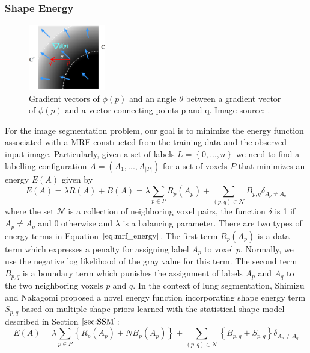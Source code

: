 \documentclass{SMBV12}
\begin{document}
\subsubsection{Shape Energy}
\begin{figure}
	\centering
    \includegraphics[width=0.3\textwidth]{images/shape_energy.png}
    \caption{Gradient vectors of $\phi(p)$ and an angle $\theta$ between a gradient vector of $\phi(p)$ and a vector connecting points p and q. Image source: \cite{shimizu2011automated}.}
    \label{fig:shape_energy}
\end{figure}
For the image segmentation problem, our goal is to minimize the energy function associated with a MRF constructed from the training data and the observed input image. Particularly, given a set of labels $L = \left\lbrace 0, ..., n \right\rbrace $ we need to find a labelling configuration $A = (A_1, ..., A_{\lvert P \rvert})$ for a set of voxels $P$ that minimizes an energy $E(A)$ given by
\begin{equation}
E(A) = \lambda R(A) + B(A) = \lambda \sum_{p \in P} R_p(A_p) + \sum_{(p, q) \in \mathcal{N}} B_{p, q} \delta_{A_p \neq A_q}
\label{eq:mrf_energy}
\end{equation}
where the set $\mathcal{N}$ is a collection of neighboring voxel pairs, the function $\delta$ is 1 if $A_p \neq A_q$ and 0 otherwise and $\lambda$ is a balancing parameter. There are two types of energy terms in Equation $\ref{eq:mrf_energy}$. The first term $R_p(A_p)$ is a data term which expresses a penalty for assigning label $A_p$ to voxel $p$. Normally, we use the negative log likelihood of the gray value for this term. The second term $B_{p, q}$ is a boundary term which punishes the assignment of labels $A_p$ and $A_q$ to the two neighboring voxels $p$ and $q$. In the context of lung segmentation, Shimizu and Nakagomi \cite{shimizu2011automated} \cite{nakagomimulti} proposed a novel energy function incorporating shape energy term $S_{p, q}$ based on multiple shape priors learned with the statistical shape model described in Section $\ref{sec:SSM}$:
\begin{equation}
E(A) = \lambda \sum_{p \in P} \left\lbrace  R_p(A_p) + NB_p(A_p) \right\rbrace + \sum_{(p, q) \in \mathcal{N}} \left\lbrace B_{p, q} + S_{p, q} \right\rbrace \delta_{A_p \neq A_q}
\label{eq:mrf_multishape_energy}
\end{equation}
\end{document}

